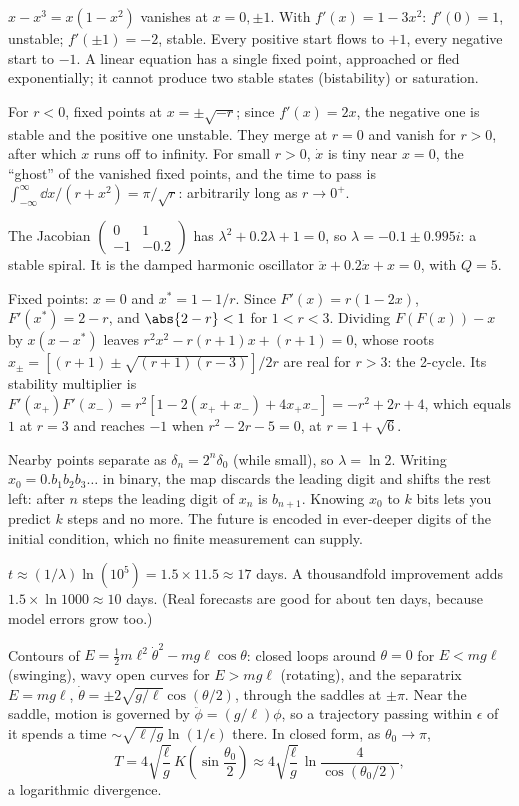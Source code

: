 
 $x - x^3 = x(1-x^2)$ vanishes at $x = 0,\pm1$. With $f'(x) = 1-3x^2$: $f'(0) = 1$, unstable; $f'(\pm1) = -2$, stable. Every positive start flows to $+1$, every negative start to $-1$. A linear equation has a single fixed point, approached or fled exponentially; it cannot produce two stable states (bistability) or saturation.

 For $r<0$, fixed points at $x = \pm\sqrt{-r}$; since $f'(x) = 2x$, the negative one is stable and the positive one unstable. They merge at $r = 0$ and vanish for $r>0$, after which $x$ runs off to infinity. For small $r>0$, $\dot x$ is tiny near $x = 0$, the ``ghost'' of the vanished fixed points, and the time to pass is $\int_{-\infty}^{\infty}\dd x/(r+x^2) = \pi/\sqrt r$: arbitrarily long as $r\to0^+$.

 The Jacobian $\begin{pmatrix}0&1\\-1&-0.2\end{pmatrix}$ has $\lambda^2 + 0.2\lambda + 1 = 0$, so $\lambda = -0.1\pm0.995i$: a stable spiral. It is the damped harmonic oscillator $\ddot x + 0.2\dot x + x = 0$, with $Q = 5$.

 Fixed points: $x = 0$ and $x^* = 1-1/r$. Since $F'(x) = r(1-2x)$, $F'(x^*) = 2-r$, and $\abs{2-r}<1$ for $1<r<3$. Dividing $F(F(x)) - x$ by $x(x-x^*)$ leaves $r^2x^2 - r(r+1)x + (r+1) = 0$, whose roots $x_\pm = [(r+1)\pm\sqrt{(r+1)(r-3)}]/2r$ are real for $r>3$: the 2-cycle. Its stability multiplier is $F'(x_+)F'(x_-) = r^2[1 - 2(x_++x_-) + 4x_+x_-] = -r^2 + 2r + 4$, which equals $1$ at $r = 3$ and reaches $-1$ when $r^2-2r-5 = 0$, at $r = 1+\sqrt6$.

 Nearby points separate as $\delta_n = 2^n\delta_0$ (while small), so $\lambda = \ln2$. Writing $x_0 = 0.b_1b_2b_3\ldots$ in binary, the map discards the leading digit and shifts the rest left: after $n$ steps the leading digit of $x_n$ is $b_{n+1}$. Knowing $x_0$ to $k$ bits lets you predict $k$ steps and no more. The future is encoded in ever-deeper digits of the initial condition, which no finite measurement can supply.

 $t\approx(1/\lambda)\ln(10^5) = 1.5\times11.5\approx17$ days. A thousandfold improvement adds $1.5\times\ln1000\approx10$ days. (Real forecasts are good for about ten days, because model errors grow too.)

 Contours of $E = \tfrac12m\ell^2\dot\theta^2 - mg\ell\cos\theta$: closed loops around $\theta = 0$ for $E<mg\ell$ (swinging), wavy open curves for $E>mg\ell$ (rotating), and the separatrix $E = mg\ell$, $\dot\theta = \pm2\sqrt{g/\ell}\cos(\theta/2)$, through the saddles at $\pm\pi$. Near the saddle, motion is governed by $\ddot\phi = (g/\ell)\phi$, so a trajectory passing within $\epsilon$ of it spends a time $\sim\sqrt{\ell/g}\ln(1/\epsilon)$ there. In closed form, as $\theta_0\to\pi$,
\[
  T = 4\sqrt{\frac{\ell}{g}}\,K\!\left(\sin\frac{\theta_0}{2}\right)\approx4\sqrt{\frac{\ell}{g}}\,\ln\frac{4}{\cos(\theta_0/2)},
\]
a logarithmic divergence.

